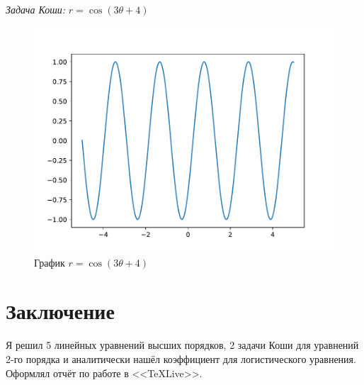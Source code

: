 \documentclass[a4paper, 14pt, fleqn]{extarticle}
\begin{document}
\begin{enumerate}
					\textit{Задача Коши:} \( r = \cos{(3\theta + 4)} \)

					\begin{figure}[H]
					   	\centering
					    	\includegraphics[width = .75\linewidth]{2.pdf}
						\caption[.] {График  \( r = \cos{(3\theta + 4)} \)}
  					\end{figure}
			\end{enumerate}

	\pagebreak
	\section{Заключение}
		\noindent Я решил 5 линейных уравнений высших порядков, 2 задачи Коши для уравнений 2-го порядка и аналитически нашёл коэффициент для логистического уравнения. Оформлял отчёт по работе в <<\TeX \:Live>>.
\end{document}
